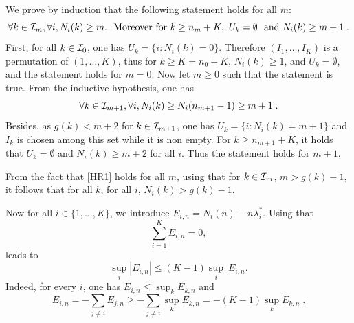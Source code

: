 \documentclass{colt2016} %
\begin{document}
We prove by induction that the following statement holds for all $m$: 
\begin{equation}\forall k \in \mathcal{I}_m, \forall i,  N_i(k) \geq m.\ \ \text{Moreover} \ \text{for} \ k \geq n_{m} + K,  \ U_k = \emptyset \ \ \text{and} \ N_i(k) \geq m+1\;.\label{HR1} \end{equation}
First, for all $k \in \mathcal{I}_0$, one has $U_k = \{ i : N_i(k)=0 \}$. Therefore $(I_1,\dots,I_K)$ is a permutation of $(1,\dots,K)$, thus for  $k \geq K = n_0 + K$, $N_i(k) \geq 1$, and $U_k = \emptyset$, and the statement holds for $m=0$. Now let $m\geq 0$ such that the statement is true. From the inductive hypothesis, one has 
 \[\forall k \in \mathcal{I}_{m+1}, \forall i,   N_{i}(k) \geq N_i(n_{m+1}-1) \geq m + 1\;.\] 
Besides, as $g(k) < m+2$ for $k \in \mathcal{I}_{m+1}$, one has $U_k = \{ i : N_i(k) = m +1\}$ and $I_k$ is chosen among this set while it is non empty. For $k \geq n_{m+1} +K$, it holds that $U_k = \emptyset$ and $N_i(k) \geq m +2$ for all $i$. Thus the statement holds for $m+1$.  

From the fact that \eqref{HR1} holds for all $m$, using that for $k \in \mathcal{I}_m$, $m > g(k) -1$, it follows that for all $k$, for all $i$,  $N_i(k) > g(k) -1 $.


Now for all $i \in \{1,\dots,K\}$, we introduce $E_{i,n} = N_{i}(n) - n \lambda^*_i$. Using that 
\begin{equation}\sum_{i=1}^K E_{i,n} = 0,\label{Nul}\end{equation}
leads to
\[\sup_i |E_{i,n}| \leq (K-1) \sup_i \ E_{i,n}.\]
Indeed, for every $i$, one has $E_{i,n} \leq \sup_{k} E_{k,n}$ and  
\[E_{i,n} = - \sum_{j \neq i} E_{j,n} \geq - \sum_{j \neq i} \sup_{k} E_{k,n} = - (K-1)\sup_{k}E_{k,n}\;.\] 
\end{document}
